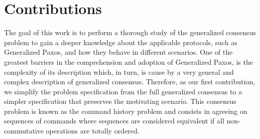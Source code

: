 \section{Contributions}
The goal of this work is to perform a thorough study of the generalized consensus problem to gain a deeper knowledge about the applicable protocols, such as Generalized Paxos, and how they behave in different scenarios. One of the greatest barriers in the comprehension and adoption of Generalized Paxos, is the complexity of its description which, in turn, is cause by a very general and complex description of generalized consensus. Therefore, as our first contribution, we simplify the problem specification from the full generalized consensus to a simpler specification that preserves the motivating scenario. This consensus problem is known as the command history problem and consists in agreeing on sequences of commands where sequences are considered equivalent if all non-commutative operations are totally ordered. \par

